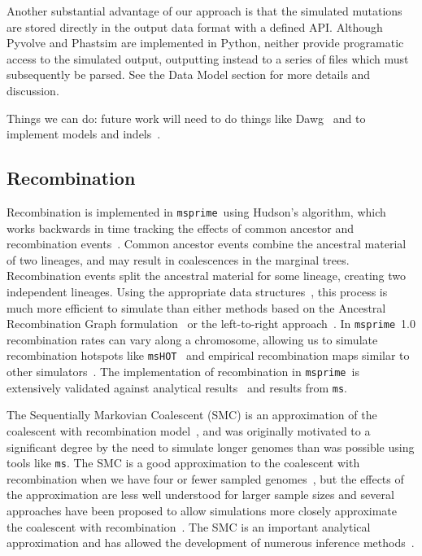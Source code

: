 \documentclass{article}
\newcommand{\msprime}[0]{\texttt{msprime}}
\newcommand{\ms}[0]{\texttt{ms}}
\begin{document}
Another substantial advantage of our approach is that the simulated
mutations are stored directly in the output data format with
a defined API. Although
Pyvolve and Phastsim are implemented in Python, neither provide
programatic access to the simulated output, outputting instead
to a series of files which must subsequently be parsed.
See the Data Model section for more details and discussion.

Things we can do: future work will need to do things like
Dawg~\citep{cartwright2005dna} and to implement models and
indels~\citep{fletcher2009indelible}.

\subsection*{Recombination}

Recombination is implemented in \msprime\ using Hudson's algorithm, which
works backwards in time tracking the
effects of common ancestor and recombination
events~\citep{hudson1983properties,hudson1990gene,kelleher2016efficient}.
Common ancestor events combine the ancestral material of two lineages, and may
result in coalescences in the marginal trees. Recombination events
split the ancestral material for some lineage, creating two independent
lineages. Using the appropriate data structures~\citep{kelleher2016efficient},
this process is much more efficient to simulate than either
methods based on the Ancestral Recombination Graph
formulation~\citep{griffiths1991two,griffiths1997ancestral}
or the left-to-right approach~\citep{wiuf1999recombination,wiuf1999ancestry}.
In \msprime\ 1.0 recombination rates can vary along a chromosome, allowing
us to simulate recombination hotspots like \texttt{msHOT}~\citep{hellenthal2007mshot}
and empirical recombination maps similar to other
simulators~\citep[e.g.][]{shlyakhter2014cosi2}.
The implementation of recombination in \msprime\ is extensively validated
against analytical results~\citep{hudson1983properties,kaplan1985use}
and results from \ms.

The Sequentially Markovian Coalescent (SMC) is an approximation of the
coalescent with recombination
model~\citep{mcvean2005approximating,marjoram2006fast},
and was originally motivated to a significant degree by the need to
simulate longer genomes than was possible using tools like \ms.
The SMC is a good approximation to the
coalescent with recombination when we have four or fewer sampled
genomes~\citep{hobolth2014markovian,wilton2015smc}, but the
effects of the approximation are less well understood for larger
sample sizes and several approaches have been proposed to
allow simulations more closely approximate the coalescent
with recombination~\citep{chen2009fast,wang2014new,staab2015scrm}.
The SMC is an important analytical approximation
and has allowed the development of numerous inference
methods~\citep{
li2011inference,
harris2013inferring,
sheehan2013estimating,
schiffels2014inferring,
carmi2014renewal,
rasmussen2014genome,
zheng2014bayesian,
terhorst2017robust}.
\end{document}
